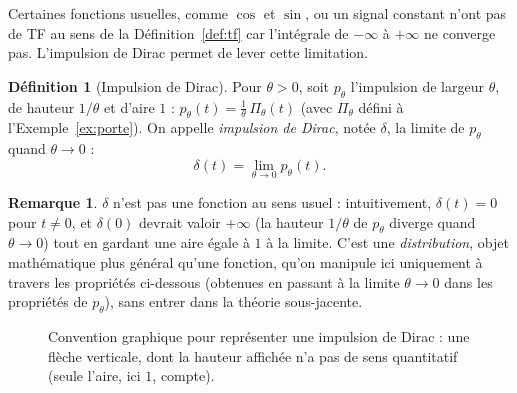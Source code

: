 \documentclass[a4paper,11pt]{article}
\theoremstyle{definition}
\newtheorem{definition}{Définition}[section]
\newtheorem{proposition}{Propriété}[section]
\newtheorem{remark}{Remarque}[section]
\newcommand{\highlight}[1]{{\color{niceblue}\emph{#1}}}
\begin{document}
Certaines fonctions usuelles, comme $\cos$ et $\sin$, ou un signal constant n'ont pas de TF au sens de la Définition~\ref{def:tf} car l'intégrale de $-\infty$ à $+\infty$ ne converge pas.
L'impulsion de Dirac permet de lever cette limitation.

\begin{definition}[Impulsion de Dirac]
    \label{def:dirac}
    Pour $\theta>0$, soit $p_\theta$ l'impulsion de largeur $\theta$, de hauteur $1/\theta$ et d'aire $1$ : $p_\theta(t) = \frac1\theta\,\Pi_\theta(t)$ (avec $\Pi_\theta$ défini à l'Exemple~\ref{ex:porte}). On appelle \highlight{impulsion de Dirac}, notée $\delta$, la limite de $p_\theta$ quand $\theta\to0$ :
    $$
        \delta(t) = \lim_{\theta\to0} p_\theta(t).
    $$
\end{definition}

\begin{remark}
    $\delta$ n'est pas une fonction au sens usuel : intuitivement, $\delta(t)=0$ pour $t\neq0$, et $\delta(0)$ devrait valoir $+\infty$ (la hauteur $1/\theta$ de $p_\theta$ diverge quand $\theta\to0$) tout en gardant une aire égale à $1$ à la limite. C'est une \highlight{distribution}, objet mathématique plus général qu'une fonction, qu'on manipule ici uniquement à travers les propriétés ci-dessous (obtenues en passant à la limite $\theta\to0$ dans les propriétés de $p_\theta$), sans entrer dans la théorie sous-jacente.
\end{remark}

\begin{figure}[h]
    \centering
    \caption{Convention graphique pour représenter une impulsion de Dirac : une flèche verticale, dont la hauteur affichée n'a pas de sens quantitatif (seule l'aire, ici $1$, compte).}
\end{figure}



\end{document}
